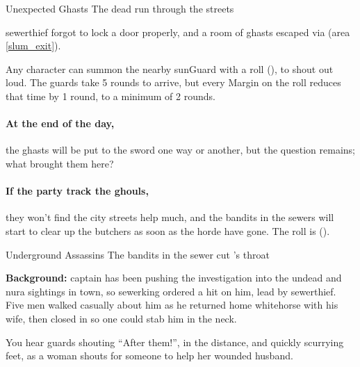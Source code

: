 \warningbard

{Unexpected Ghasts}%
{The dead run through the streets}%

\Gls{sewerthief} forgot to lock a door properly, and a room of ghasts escaped via  (area \vref{slum_exit}).




Any character can summon the nearby \gls{sunGuard} with a  roll (\tn[7]), to shout out loud.
The guards take 5 rounds to arrive, but every Margin on the roll reduces that time by 1 round, to a minimum of 2 rounds.


\paragraph{At the end of the day,}
the ghasts will be put to the sword one way or another, but the question remains; what brought them here?

\paragraph{If the party track the ghouls,}
they won't find the city streets help much, and the bandits in the sewers will start to clear up the butchers as soon as the horde have gone.
The roll is  (\tn[14]).

{Underground Assassins}%
{The bandits in the sewer cut 's throat}%

\textbf{Background:}
\Gls{captain} has been pushing the investigation into the undead and nura sightings in town, so \gls{sewerking} ordered a hit on him, lead by \gls{sewerthief}.
Five men walked casually about him as he returned home \gls{whitehorse} with his wife, then closed in so one could stab him in the neck.

\begin{boxtext}

  You hear guards shouting ``After them!'', in the distance, and quickly scurrying feet, as a woman shouts for someone to help her wounded husband.

\end{boxtext}

